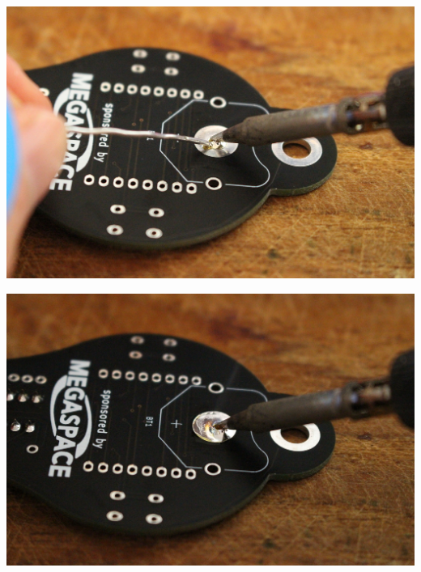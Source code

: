 \documentclass{article}
\begin{document}
\begin{minipage}[b]{0.5\textwidth}
	\includegraphics[width=\textwidth]{Bilder2022/IMG_8202.JPG}
\end{minipage}
\begin{minipage}[b]{0.5\textwidth}
	\includegraphics[width=\textwidth]{Bilder2022/IMG_8203.JPG}
\end{minipage}

\vspace{0.5cm}
\end{document}
